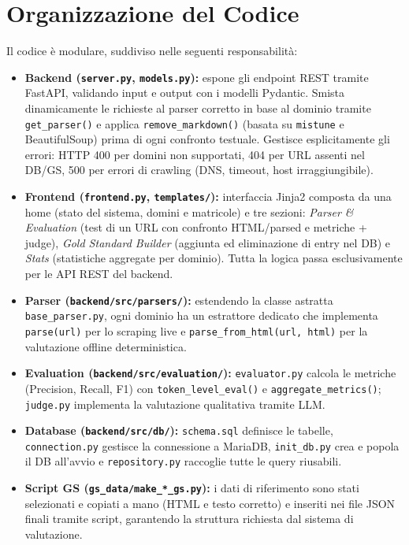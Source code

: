 \documentclass[11pt]{article}
\begin{document}
\section{Organizzazione del Codice}
Il codice è modulare, suddiviso nelle seguenti responsabilità:
\begin{itemize}
    \item \textbf{Backend (\texttt{server.py}, \texttt{models.py}):} espone gli endpoint REST tramite FastAPI, validando input e output con i modelli Pydantic. Smista dinamicamente le richieste al parser corretto in base al dominio tramite \texttt{get\_parser()} e applica \texttt{remove\_markdown()} (basata su \texttt{mistune} e BeautifulSoup) prima di ogni confronto testuale. Gestisce esplicitamente gli errori: HTTP 400 per domini non supportati, 404 per URL assenti nel DB/GS, 500 per errori di crawling (DNS, timeout, host irraggiungibile).
    \item \textbf{Frontend (\texttt{frontend.py}, \texttt{templates/}):} interfaccia Jinja2 composta da una home (stato del sistema, domini e matricole) e tre sezioni: \emph{Parser \& Evaluation} (test di un URL con confronto HTML/parsed e metriche + judge), \emph{Gold Standard Builder} (aggiunta ed eliminazione di entry nel DB) e \emph{Stats} (statistiche aggregate per dominio). Tutta la logica passa esclusivamente per le API REST del backend.
    \item \textbf{Parser (\texttt{backend/src/parsers/}):} estendendo la classe astratta \texttt{base\_parser.py}, ogni dominio ha un estrattore dedicato che implementa \texttt{parse(url)} per lo scraping live e \texttt{parse\_from\_html(url, html)} per la valutazione offline deterministica.
    \item \textbf{Evaluation (\texttt{backend/src/evaluation/}):} \texttt{evaluator.py} calcola le metriche (Precision, Recall, F1) con \texttt{token\_level\_eval()} e \texttt{aggregate\_metrics()}; \texttt{judge.py} implementa la valutazione qualitativa tramite LLM.
    \item \textbf{Database (\texttt{backend/src/db/}):} \texttt{schema.sql} definisce le tabelle, \texttt{connection.py} gestisce la connessione a MariaDB, \texttt{init\_db.py} crea e popola il DB all'avvio e \texttt{repository.py} raccoglie tutte le query riusabili.
    \item \textbf{Script GS (\texttt{gs\_data/make\_*\_gs.py}):} i dati di riferimento sono stati selezionati e copiati a mano (HTML e testo corretto) e inseriti nei file JSON finali tramite script, garantendo la struttura richiesta dal sistema di valutazione.
\end{itemize}
\end{document}
